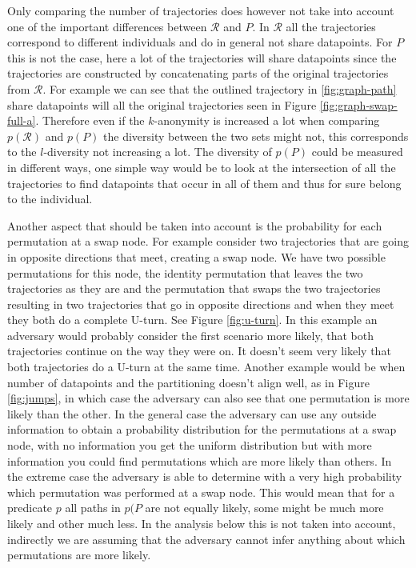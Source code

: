 \documentclass[12pt]{article}
\newcommand{\cotraj}{\mathcal{R}}
\newcommand{\pred}{p}
\newcommand{\paths}{P}
\theoremstyle{definition}
\begin{document}
Only comparing the number of trajectories does however not take into
account one of the important differences between \(\cotraj\) and
\(\paths\). In \(\cotraj\) all the trajectories correspond to
different individuals and do in general not share datapoints. For
\(\paths\) this is not the case, here a lot of the trajectories will
share datapoints since the trajectories are constructed by
concatenating parts of the original trajectories from \(\cotraj\). For
example we can see that the outlined trajectory in
\ref{fig:graph-path} share datapoints will all the original
trajectories seen in Figure \ref{fig:graph-swap-full-a}. Therefore
even if the \(k\)-anonymity is increased a lot when comparing
\(\pred(\cotraj)\) and \(\pred(\paths)\) the diversity between the two
sets might not, this corresponds to the \(l\)-diversity not increasing
a lot. The diversity of \(\pred(\paths)\) could be measured in
different ways, one simple way would be to look at the intersection of
all the trajectories to find datapoints that occur in all of them
and thus for sure belong to the individual.

Another aspect that should be taken into account is the probability
for each permutation at a swap node. For example consider two
trajectories that are going in opposite directions that meet, creating
a swap node. We have two possible permutations for this node, the
identity permutation that leaves the two trajectories as they are and
the permutation that swaps the two trajectories resulting in two
trajectories that go in opposite directions and when they meet they
both do a complete U-turn. See Figure \ref{fig:u-turn}. In this
example an adversary would probably consider the first scenario more
likely, that both trajectories continue on the way they were on. It
doesn't seem very likely that both trajectories do a U-turn at the
same time. Another example would be when number of datapoints and the
partitioning doesn't align well, as in Figure \ref{fig:jumps}, in
which case the adversary can also see that one permutation is more
likely than the other. In the general case the adversary can use any
outside information to obtain a probability distribution for the
permutations at a swap node, with no information you get the uniform
distribution but with more information you could find permutations
which are more likely than others. In the extreme case the adversary
is able to determine with a very high probability which permutation
was performed at a swap node. This would mean that for a predicate
\(\pred\) all paths in \(\pred(\paths\) are not equally likely, some
might be much more likely and other much less. In the analysis below
this is not taken into account, indirectly we are assuming that the
adversary cannot infer anything about which permutations are more
likely.
\end{document}
